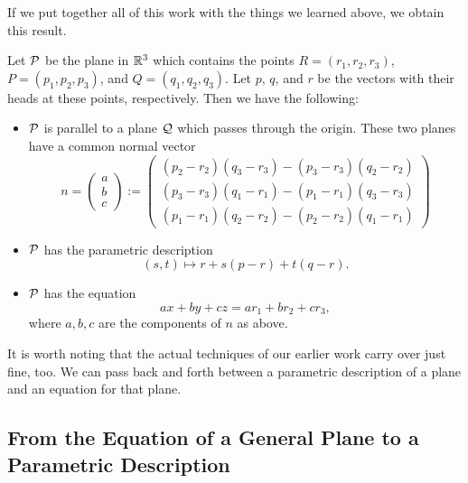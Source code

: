 \documentclass[00-livre-main.tex]{subfiles}
\begin{document}
If we put together all of this work with the things we learned above, we obtain this result.

\begin{theorem}
Let $\mathcal{P}$ be the plane in $\mathbb{R}^3$ which contains the points $R = (r_1, r_2, r_3)$, $P=(p_1,p_2,p_3)$, and $Q=(q_1,q_2,q_3)$. Let $p$, $q$, and $r$ be the vectors with their heads at these points, respectively. Then we have the following:
\begin{itemize}
\item $\mathcal{P}$ is parallel to a plane $\mathcal{Q}$ which passes through the origin. These two planes have a common normal vector
\[
n = \begin{pmatrix} a \\ b \\ c \end{pmatrix} := 
\begin{pmatrix} (p_2-r_2)( q_3-r_3) - (p_3 -r_3)(q_2-r_2) \\
(p_3-r_3)(q_1-r_1) - (p_1-r_1)( q_3-r_3) \\ (p_1-r_1)(q_2-r_2) - (p_2-r_2) (q_1-r_1) \end{pmatrix}
\]

\item $\mathcal{P}$ has the parametric description
\[
(s,t) \mapsto r + s (p-r) + t(q-r).
\]

\item $\mathcal{P}$ has the equation
\[
ax + by +cz = ar_1 + br_2 + cr_3,
\]
where $a, b, c$ are the components of $n$ as above.
\end{itemize}
\end{theorem}

It is worth noting that the actual techniques of our earlier work carry over just fine, too. We can pass back and forth between a parametric description of a plane and an equation for that plane.

\subsection*{From the Equation of a General Plane to a Parametric Description}
\end{document}
